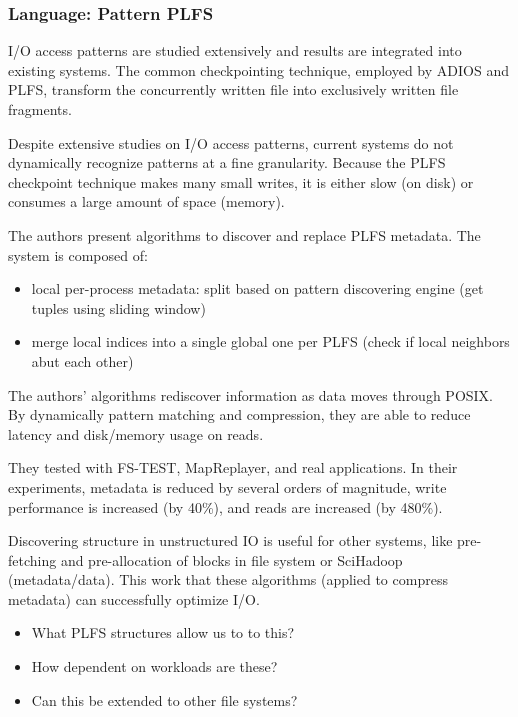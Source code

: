 \subsubsection{Language: Pattern PLFS}
\label{sec:language-patterned-io}

I/O access patterns are studied extensively and results are integrated into
existing systems. The common checkpointing technique, employed by ADIOS and
PLFS, transform the concurrently written file into exclusively written file
fragments. 

Despite extensive studies on I/O access patterns, current systems do not
dynamically recognize patterns at a fine granularity. Because the PLFS
checkpoint technique makes many small writes, it is either slow (on disk) or
consumes a large amount of space (memory).  

The authors present algorithms to discover and replace PLFS metadata. The
system is composed of: 

\begin{itemize}

  \item local per-process metadata: split based on pattern discovering engine
  (get tuples using sliding window)

  \item merge local indices into a single global one per PLFS (check if local
  neighbors abut each other)

\end{itemize}

The authors' algorithms rediscover information as data moves through POSIX. By
dynamically  pattern matching and compression, they are able to reduce latency
and disk/memory usage on reads. 

They tested with FS-TEST, MapReplayer, and real applications. In their
experiments, metadata is reduced by several orders of magnitude, write
performance is increased (by 40\%), and reads are increased (by 480\%). 


Discovering structure in unstructured IO is useful for other systems, like
pre-fetching and pre-allocation of blocks in file system or SciHadoop
(metadata/data). This work that these algorithms (applied to compress metadata)
can successfully optimize I/O. 

\begin{itemize}

  \item What PLFS structures allow us to to this?

  \item How dependent on workloads are these?

  \item Can this be extended to other file systems?

\end{itemize}


